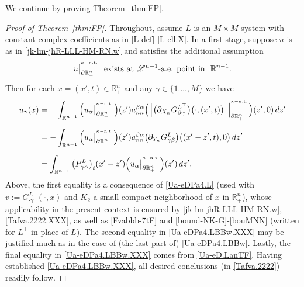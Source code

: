 \documentclass[11pt,reqno]{amsart}
\numberwithin{equation}{section}
\theoremstyle{remark}
\begin{document}
We continue by proving Theorem~\ref{thm:FP}.

\vskip 0.08in
\begin{proof}[Proof of Theorem~\ref{thm:FP}]
Throughout, assume $L$ is an $M\times M$ system with constant complex coefficients as in \eqref{L-def}-\eqref{L-ell.X}.
In a first stage, suppose $u$ is as in \eqref{jk-lm-jhR-LLL-HM-RN.w} and satisfies the additional assumption  
%
\begin{eqnarray}\label{Tafva.2222.XXX}
u\big|^{{}^{\kappa-{\rm n.t.}}}_{\partial{\mathbb{R}}^n_{+}}
\,\,\text{ exists at ${\mathscr{L}}^{n-1}$-a.e. point in }\,\,{\mathbb{R}}^{n-1}.
\end{eqnarray}
%
Then for each $x=(x',t)\in{\mathbb{R}}^n_{+}$ and any $\gamma\in\{1.\dots,M\}$ we have 
%
\begin{align}\label{Ua-eDPa4.LBBw.XXX}
u_\gamma(x) &=-\int_{\mathbb{R}^{n-1}}\Big(u_\alpha\big|^{{}^{\kappa-{\rm n.t.}}}_{\partial{\mathbb{R}}^n_{+}}\Big)(z')a^{\beta\alpha}_{nn}
\Big(\Big[\big(\partial_{X_n}G^{L^\top}_{\beta\gamma}\big)\big(\cdot,(x',t)\big)\Big]
\Big|_{\partial\mathbb{R}^{n}_{+}}^{{}^{\kappa-{\rm n.t.}}}\Big)(z',0)\,dz'
\nonumber\\[6pt]
&=-\int_{\mathbb{R}^{n-1}}\Big(u_\alpha\big|^{{}^{\kappa-{\rm n.t.}}}_{\partial{\mathbb{R}}^n_{+}}\Big)(z')a^{\beta\alpha}_{nn}
\big(\partial_{Y_n} G^{L}_{\gamma\beta}\big)\big((x'-z',t),0\big)\,dz'
\nonumber\\[6pt]
&=\int_{\mathbb{R}^{n-1}}\big(P^L_{\gamma\alpha}\big)_t(x'-z')
\Big(u_\alpha\big|^{{}^{\kappa-{\rm n.t.}}}_{\partial{\mathbb{R}}^n_{+}}\Big)(z')\,dz'.
\end{align}
%
Above, the first equality is a consequence of \eqref{Ua-eDPa4.L} (used with $v:=G^{L^\top}_{\cdot\gamma}(\cdot,x)$ and 
$K_2$ a small compact neighborhood of $x$ in ${\mathbb{R}}^n_{+}$), whose applicability in the present context is ensured 
by \eqref{jk-lm-jhR-LLL-HM-RN.w}, \eqref{Tafva.2222.XXX}, as well as \eqref{Fvabbb-7tF} and \eqref{bound-NK-G}-\eqref{bouMNN} 
(written for $L^\top$ in place of $L$). The second equality in \eqref{Ua-eDPa4.LBBw.XXX} may be justified much as in the case 
of (the last part of) \eqref{Ua-eDPa4.LBBw}. Lastly, the final equality in \eqref{Ua-eDPa4.LBBw.XXX} comes from \eqref{Ua-eD.LanTF}.
Having established \eqref{Ua-eDPa4.LBBw.XXX}, all desired conclusions (in \eqref{Tafva.2222}) readily follow. 


\end{proof}
\end{document}
